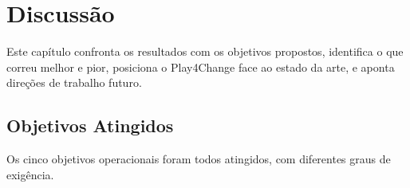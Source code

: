 %
%
\chapter{Discussão} \label{cap:discussao}

Este capítulo confronta os resultados com os objetivos propostos, identifica o que correu melhor e pior, posiciona o Play4Change face ao estado da arte, e aponta direções de trabalho futuro.

\section{Objetivos Atingidos} \label{sec:analise-objetivos}

Os cinco objetivos operacionais foram todos atingidos, com diferentes graus de exigência.

